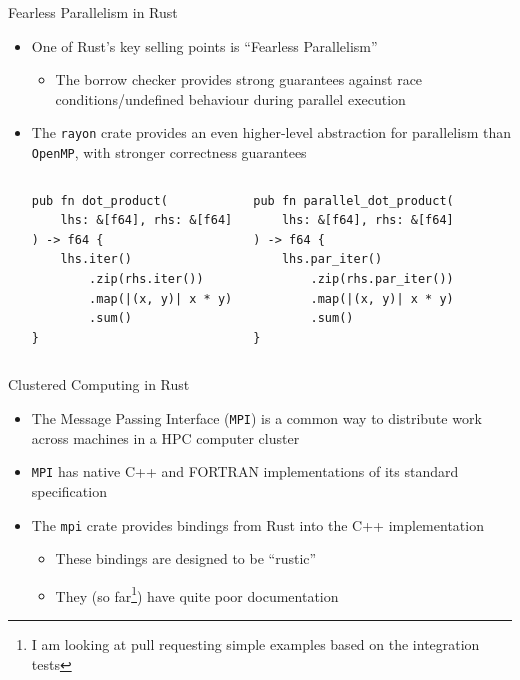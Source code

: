 \documentclass[10pt,aspectratio=169]{beamer}
\begin{document}
\begin{frame}[fragile]{Fearless Parallelism in Rust}
    \begin{itemize}
        \item<1-> One of Rust's key selling points is ``Fearless Parallelism''
        \begin{itemize}
            \item The borrow checker provides strong guarantees against race conditions/undefined behaviour during parallel execution
        \end{itemize}
        \vspace*{0.5cm}
        \item<2-> The \texttt{rayon} crate provides an even higher-level abstraction for parallelism than \texttt{OpenMP}, with stronger correctness guarantees
        \begin{columns}[T,onlytextwidth]
            \centering
            \begin{verbatim}
pub fn dot_product(
    lhs: &[f64], rhs: &[f64]
) -> f64 {
    lhs.iter()
        .zip(rhs.iter())
        .map(|(x, y)| x * y)
        .sum()
}
            \end{verbatim}
            \begin{verbatim}
pub fn parallel_dot_product(
    lhs: &[f64], rhs: &[f64]
) -> f64 {
    lhs.par_iter()
        .zip(rhs.par_iter())
        .map(|(x, y)| x * y)
        .sum()
}
            \end{verbatim}
        \end{columns}
    \end{itemize}
\end{frame}

\begin{frame}{Clustered Computing in Rust}
    \begin{itemize}
        \item The Message Passing Interface (\texttt{MPI}) is a common way to distribute work across machines in a HPC computer cluster
        \item \texttt{MPI} has native C++ and FORTRAN implementations of its standard specification
        \item The \texttt{mpi} crate provides bindings from Rust into the C++ implementation
        \begin{itemize}
            \item These bindings are designed to be ``rustic''
            \item They (so far\footnote{I am looking at pull requesting simple examples based on the integration tests}) have quite poor documentation
        \end{itemize}
    \end{itemize}
\end{frame}
\end{document}
